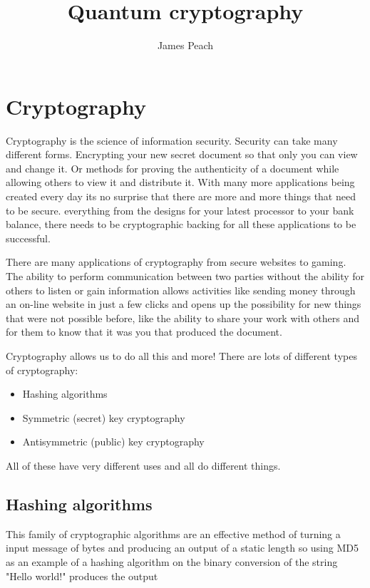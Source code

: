 \documentclass[12pt]{article}
\begin{document}
\author{James Peach}
\title{Quantum cryptography}

\maketitle

\section{Cryptography}
Cryptography is the science of information security. Security can take
many different forms. Encrypting your new secret document so that only
you can view and change it. Or methods for proving the authenticity of 
a document while allowing others to view it and distribute it. With many
more applications being created every day its no surprise that there
are more and more things that need to be secure. everything from the designs for
your latest processor to your bank balance, there needs to be cryptographic
backing for all these applications to be successful.


There are many applications of cryptography from secure
websites to gaming. The ability to perform communication between two parties
without the ability for others to listen or gain information allows activities like sending money
through an on-line website in just a few clicks and opens up the possibility
for new things that were not possible before, like the ability to share
your work with others and for them to know that it was you that produced
the document.

Cryptography allows us to do all this and more! There are lots of
different types of cryptography:
\begin{itemize}
  \item Hashing algorithms
  \item Symmetric (secret) key cryptography
  \item Antisymmetric (public) key cryptography
\end{itemize}
All of these have very different uses and all do different things.

\subsection{Hashing algorithms}
This family of cryptographic algorithms are an effective method of turning
a input message of bytes and producing an output of a static length
so using MD5 as an example of a hashing algorithm on the binary conversion
of the string "Hello world!" produces the output 
\end{document}
